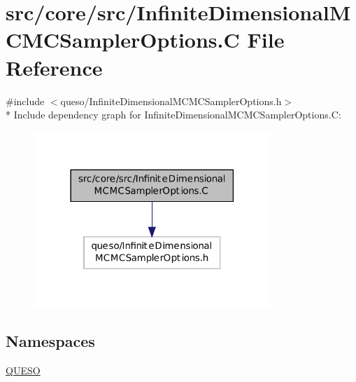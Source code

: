\hypertarget{_infinite_dimensional_m_c_m_c_sampler_options_8_c}{\section{src/core/src/\-Infinite\-Dimensional\-M\-C\-M\-C\-Sampler\-Options.C File Reference}
\label{_infinite_dimensional_m_c_m_c_sampler_options_8_c}
}
{\ttfamily \#include $<$queso/\-Infinite\-Dimensional\-M\-C\-M\-C\-Sampler\-Options.\-h$>$}\\*
Include dependency graph for Infinite\-Dimensional\-M\-C\-M\-C\-Sampler\-Options.\-C\-:
\nopagebreak
\begin{figure}[H]
\begin{center}
\leavevmode
\includegraphics[width=254pt]{_infinite_dimensional_m_c_m_c_sampler_options_8_c__incl}
\end{center}
\end{figure}
\subsection*{Namespaces}
\begin{DoxyCompactItemize}
\item 
\hyperlink{namespace_q_u_e_s_o}{Q\-U\-E\-S\-O}
\end{DoxyCompactItemize}
